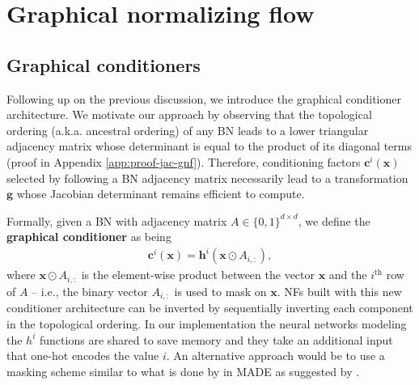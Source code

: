 \section{Graphical normalizing flow}
\subsection{Graphical conditioners}
Following up on the previous discussion, we introduce the graphical conditioner architecture.
We motivate our approach by observing that the topological ordering (a.k.a. ancestral ordering) of any BN leads to a lower triangular adjacency matrix whose determinant is equal to the product of its diagonal terms (proof in Appendix \ref{app:proof-jac-gnf}).
Therefore, conditioning factors $\mathbf{c}^i(\mathbf{x})$ selected by following a BN adjacency matrix necessarily lead to a transformation $\mathbf{g}$ whose Jacobian determinant remains efficient to compute.

Formally, given a BN with adjacency matrix $A \in \{0, 1\}^{d\times d}$, we define the \textbf{graphical conditioner} as being
\begin{align}
    \mathbf{c}^i(\mathbf{x}) = \mathbf{h}^i(\mathbf{x} \odot A_{i,:}),
\label{eq:gnf}
\end{align}
where $\mathbf{x} \odot A_{i,:}$ is the element-wise product between the vector $\mathbf{x}$ and the $i^{\text{th}}$ row of $A$ -- i.e., the binary vector $A_{i, :}$ is used to mask on $\mathbf{x}$.
NFs built with this new conditioner architecture can be inverted by sequentially inverting each component in the topological ordering.
In our implementation the neural networks modeling the $h^i$ functions are shared to save memory and they take an additional input that one-hot encodes the value $i$. An alternative approach would be to use a masking scheme similar to what is done by \citet{MADE} in MADE as suggested by \cite{DAG-3}.


